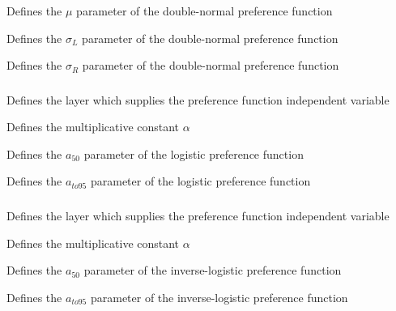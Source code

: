  {Defines the $\mu$ parameter of the double-normal preference function}

 {Defines the $\sigma_L$ parameter of the double-normal preference function}

 {Defines the $\sigma_R$ parameter of the double-normal preference function}

\subsubsection[Logistic]{}

 {Defines the layer which supplies the preference function independent variable}

 {Defines the multiplicative constant $\alpha$}

 {Defines the $a_{50}$ parameter of the logistic preference function}

 {Defines the $a_{to95}$ parameter of the logistic preference function}

\subsubsection[Inverse-logistic]{}

 {Defines the layer which supplies the preference function independent variable}

 {Defines the multiplicative constant $\alpha$}

 {Defines the $a_{50}$ parameter of the inverse-logistic preference function}

 {Defines the $a_{to95}$ parameter of the inverse-logistic preference function}

\subsubsection[Exponential]{}

